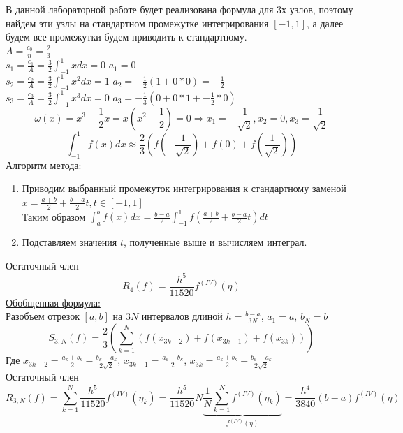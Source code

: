 \documentclass{article}
\begin{document}
	В данной лабораторной работе будет реализована формула для 3х узлов, поэтому найдем эти узлы на стандартном промежутке интегрирования $[-1, 1]$, а далее будем все промежутки будем приводить к стандартному.\\
	$A = \frac{c_0}{n} = \frac{2}{3}$\\
	$s_1 = \frac{c_1}{A} = \frac{3}{2}\int_{-1}^{1}xdx = 0$ \hfil $a_1 = 0$\\
	$s_2 = \frac{c_2}{A} = \frac{3}{2}\int_{-1}^{1}x^2dx = 1$ \hfil $a_2 = -\frac{1}{2}(1 + 0 * 0) = -\frac{1}{2}$\\
	$s_3 = \frac{c_3}{A} = \frac{3}{2}\int_{-1}^{1}x^3dx = 0$ \hfil $a_3 = -\frac{1}{3}(0 + 0 * 1 + -\frac{1}{2} * 0)$\\
	$$\omega(x) = x^3 -\frac{1}{2}x = x(x^2 -\frac{1}{2}) = 0 \Rightarrow x_1 = -\frac{1}{\sqrt{2}}, x_2 = 0, x_3 = \frac{1}{\sqrt{2}}$$
	\begin{equation}
		\int_{-1}^{1}f(x)dx \approx \frac{2}{3}(f(-\frac{1}{\sqrt{2}}) + f(0) + f(\frac{1}{\sqrt{2}}))	
	\end{equation}
	\newpage
	\underline{Алгоритм метода:}
	\begin{enumerate}
		\item Приводим выбранный промежуток интегрирования к стандартному заменой\\ $x = \frac{a+b}{2} + \frac{b-a}{2}t, t \in [-1, 1]$\\
		Таким образом $\int_{a}^{b}f(x)dx = \frac{b-a}{2}\int_{-1}^{1}f(\frac{a+b}{2} + \frac{b-a}{2}t)dt$
		\item Подставляем значения $t$, полученные выше и вычисляем интеграл.
	\end{enumerate}
	Остаточный член
	\begin{equation}
		R_4(f) = \frac{h^5}{11520}f^{(IV)}(\eta)
	\end{equation}
	\underline{Обобщенная формула:}\\
	Разобъем отрезок $[a,b]$ на $3N$ интервалов длиной $h = \frac{b-a}{3N}$, $a_1 = a$, $b_N = b$
	\begin{equation}
		S_{3, N}(f) = \frac{2}{3}(\sum_{k=1}^{N}(f(x_{3k-2}) + f(x_{3k-1}) + f(x_{3k}))) 
	\end{equation}
	Где $x_{3k-2} = \frac{a_k+b_k}{2} - \frac{b_k-a_k}{2\sqrt{2}}$, $x_{3k-1} = \frac{a_k+b_k}{2}$, $x_{3k} = \frac{a_k+b_k}{2} - \frac{b_k-a_k}{2\sqrt{2}}$\\
	Остаточный член
	\begin{equation}
		R_{3, N}(f) = \sum_{k=1}^{N}\frac{h^5}{11520}f^{(IV)}(\eta_k) = \frac{h^5}{11520}N\underbrace{\frac{1}{N}\sum_{k=1}^{N}f^{(IV)}(\eta_k)}_{f^{(IV)}(\eta)} = \frac{h^4}{3840}(b-a)f^{(IV)}(\eta)
	\end{equation}
\end{document}
